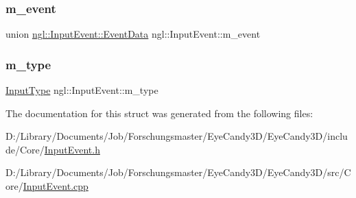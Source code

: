 \subsubsection{\texorpdfstring{m\+\_\+event}{m\_event}}
{\footnotesize\ttfamily union \mbox{\hyperlink{unionngl_1_1_input_event_1_1_event_data}{ngl\+::\+Input\+Event\+::\+Event\+Data}}  ngl\+::\+Input\+Event\+::m\+\_\+event}

\mbox{\label{structngl_1_1_input_event_a23021701bc6e144223dd1153060542f3}} 
\subsubsection{\texorpdfstring{m\+\_\+type}{m\_type}}
{\footnotesize\ttfamily \mbox{\hyperlink{namespacengl_a5b20ff50635da5e3adb6bec00c062497}{Input\+Type}} ngl\+::\+Input\+Event\+::m\+\_\+type}



The documentation for this struct was generated from the following files\+:\begin{DoxyCompactItemize}
\item 
D\+:/\+Library/\+Documents/\+Job/\+Forschungsmaster/\+Eye\+Candy3\+D/\+Eye\+Candy3\+D/include/\+Core/\mbox{\hyperlink{_input_event_8h}{Input\+Event.\+h}}\item 
D\+:/\+Library/\+Documents/\+Job/\+Forschungsmaster/\+Eye\+Candy3\+D/\+Eye\+Candy3\+D/src/\+Core/\mbox{\hyperlink{_input_event_8cpp}{Input\+Event.\+cpp}}\end{DoxyCompactItemize}
